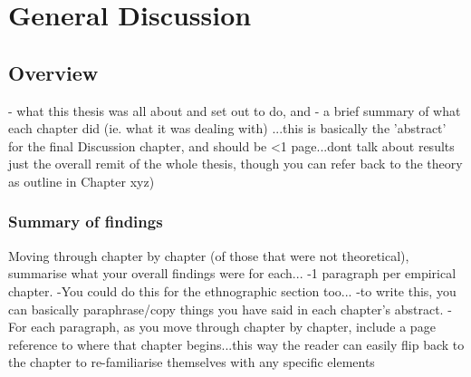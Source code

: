 

\chapter{\label{generalDiscussion}General Discussion}


\section{Overview}

 - what this thesis was all about and set out to do, and
 - a brief summary of what each chapter did (ie. what it was dealing with)
  ...this is basically the 'abstract' for the final Discussion chapter, and should be <1 page...dont talk about results just the overall remit of the whole thesis, though you can refer back to the theory as outline in Chapter xyz)

  \subsection{Summary of findings}
    Moving through chapter by chapter (of those that were not theoretical), summarise what your overall findings were for each...
      -1 paragraph per empirical chapter.
        -You could do this for the ethnographic section too...
        -to write this, you can basically paraphrase/copy things you have said in each chapter's abstract.
        - For each paragraph, as you move through chapter by chapter, include a page reference to where that chapter begins...this way the reader can easily flip back to the chapter to re-familiarise themselves with any specific elements

